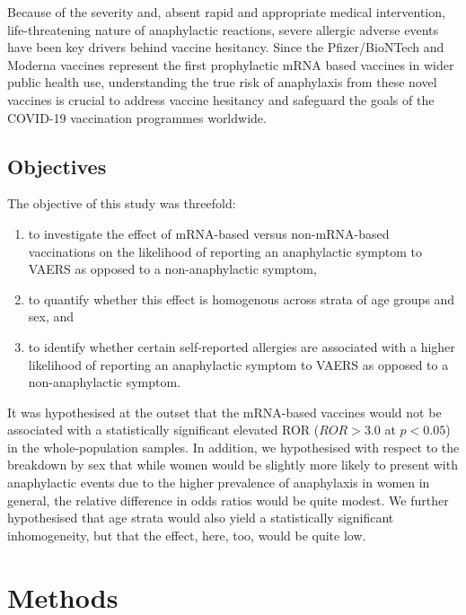 \documentclass{article}
\begin{document}
Because of the severity and, absent rapid and appropriate medical intervention, life-threatening nature of anaphylactic reactions, severe allergic adverse events have been key drivers behind vaccine hesitancy.\cite{tulloch2021covid,marcec2021postvaccination,jacobson2015vaccine}
Since the Pfizer/BioNTech and Moderna vaccines represent the first prophylactic mRNA based vaccines in wider public health use, understanding the true risk of anaphylaxis from these novel vaccines is crucial to address vaccine hesitancy and safeguard the goals of the COVID-19 vaccination programmes worldwide.

\subsection{Objectives}\label{subsec:objectives}

The objective of this study was threefold:

\begin{enumerate}
    \item to investigate the effect of mRNA-based versus non-mRNA-based vaccinations on the likelihood of reporting an anaphylactic symptom to VAERS as opposed to a non-anaphylactic symptom,
    \item to quantify whether this effect is homogenous across strata of age groups and sex, and
    \item to identify whether certain self-reported allergies are associated with a higher likelihood of reporting an anaphylactic symptom to VAERS as opposed to a non-anaphylactic symptom.
\end{enumerate}

It was hypothesised at the outset that the mRNA-based vaccines would not be associated with a statistically significant elevated ROR ($ROR > 3.0$ at $p < 0.05$) in the whole-population samples.
In addition, we hypothesised with respect to the breakdown by sex that while women would be slightly more likely to present with anaphylactic events due to the higher prevalence of anaphylaxis in women in general,\cite{salvati2019gender} the relative difference in odds ratios would be quite modest.
We further hypothesised that age strata would also yield a statistically significant inhomogeneity, but that the effect, here, too, would be quite low.

\section{Methods}
\end{document}
